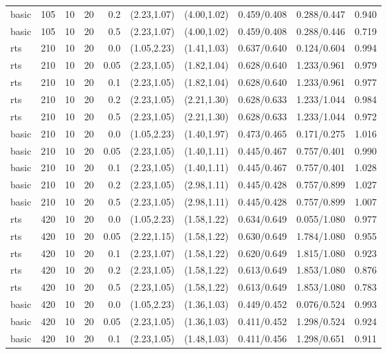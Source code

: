\begin{tabular}{llrrrccccc}
basic & 105 & 10 & 20 & 0.2 & (2.23,1.07) & (4.00,1.02) & 0.459/0.408 & 0.288/0.447 & 0.940 \\
basic & 105 & 10 & 20 & 0.5 & (2.23,1.07) & (4.00,1.02) & 0.459/0.408 & 0.288/0.446 & 0.719 \\
rts & 210 & 10 & 20 & 0.0 & (1.05,2.23) & (1.41,1.03) & 0.637/0.640 & 0.124/0.604 & 0.994 \\
rts & 210 & 10 & 20 & 0.05 & (2.23,1.05) & (1.82,1.04) & 0.628/0.640 & 1.233/0.961 & 0.979 \\
rts & 210 & 10 & 20 & 0.1 & (2.23,1.05) & (1.82,1.04) & 0.628/0.640 & 1.233/0.961 & 0.977 \\
rts & 210 & 10 & 20 & 0.2 & (2.23,1.05) & (2.21,1.30) & 0.628/0.633 & 1.233/1.044 & 0.984 \\
rts & 210 & 10 & 20 & 0.5 & (2.23,1.05) & (2.21,1.30) & 0.628/0.633 & 1.233/1.044 & 0.972 \\
basic & 210 & 10 & 20 & 0.0 & (1.05,2.23) & (1.40,1.97) & 0.473/0.465 & 0.171/0.275 & 1.016 \\
basic & 210 & 10 & 20 & 0.05 & (2.23,1.05) & (1.40,1.11) & 0.445/0.467 & 0.757/0.401 & 0.990 \\
basic & 210 & 10 & 20 & 0.1 & (2.23,1.05) & (1.40,1.11) & 0.445/0.467 & 0.757/0.401 & 1.028 \\
basic & 210 & 10 & 20 & 0.2 & (2.23,1.05) & (2.98,1.11) & 0.445/0.428 & 0.757/0.899 & 1.027 \\
basic & 210 & 10 & 20 & 0.5 & (2.23,1.05) & (2.98,1.11) & 0.445/0.428 & 0.757/0.899 & 1.007 \\
rts & 420 & 10 & 20 & 0.0 & (1.05,2.23) & (1.58,1.22) & 0.634/0.649 & 0.055/1.080 & 0.977 \\
rts & 420 & 10 & 20 & 0.05 & (2.22,1.15) & (1.58,1.22) & 0.630/0.649 & 1.784/1.080 & 0.955 \\
rts & 420 & 10 & 20 & 0.1 & (2.23,1.07) & (1.58,1.22) & 0.620/0.649 & 1.815/1.080 & 0.923 \\
rts & 420 & 10 & 20 & 0.2 & (2.23,1.05) & (1.58,1.22) & 0.613/0.649 & 1.853/1.080 & 0.876 \\
rts & 420 & 10 & 20 & 0.5 & (2.23,1.05) & (1.58,1.22) & 0.613/0.649 & 1.853/1.080 & 0.783 \\
basic & 420 & 10 & 20 & 0.0 & (1.05,2.23) & (1.36,1.03) & 0.449/0.452 & 0.076/0.524 & 0.993 \\
basic & 420 & 10 & 20 & 0.05 & (2.23,1.05) & (1.36,1.03) & 0.411/0.452 & 1.298/0.524 & 0.924 \\
basic & 420 & 10 & 20 & 0.1 & (2.23,1.05) & (1.48,1.03) & 0.411/0.456 & 1.298/0.651 & 0.911 \\

\end{tabular}
